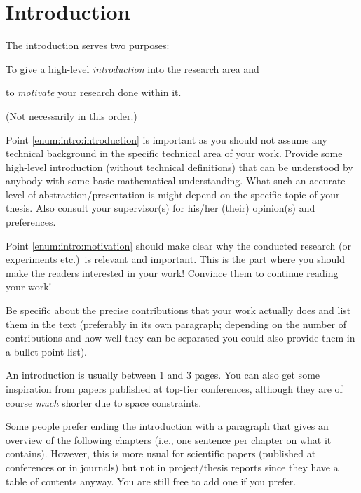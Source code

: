 \chapter{Introduction}

The introduction serves two purposes:
\begin{compactenum}
  \item To give a high-level \emph{introduction} into the research area and\label{enum:intro:introduction}
  \item to \emph{motivate} your research done within it.\label{enum:intro:motivation}
\end{compactenum}
(Not necessarily in this order.)

Point \ref{enum:intro:introduction} is important as you should not assume any technical background in the specific technical area of your work. Provide some high-level introduction (without technical definitions) that can be understood by anybody with some basic mathematical understanding. What such an accurate level of abstraction/presentation is might depend on the specific topic of your thesis. Also consult your supervisor(s) for his/her (their) opinion(s) and preferences. 

Point \ref{enum:intro:motivation} should make clear why the conducted research (or experiments etc.)\ is relevant and important. This is the part where you should make the readers interested in your work! Convince them to continue reading your work!

Be specific about the precise contributions that your work actually does and list them in the text (preferably in its own paragraph; depending on the number of contributions and how well they can be separated you could also provide them in a bullet point list).

An introduction is usually between 1 and 3 pages. You can also get some inspiration from papers published at top-tier conferences, although they are of course \emph{much} shorter due to space constraints.

Some people prefer ending the introduction with a paragraph that gives an overview of the following chapters (i.e., one sentence per chapter on what it contains). However, this is more usual for scientific papers (published at conferences or in journals) but not in project/thesis reports since they have a table of contents anyway. You are still free to add one if you prefer.
